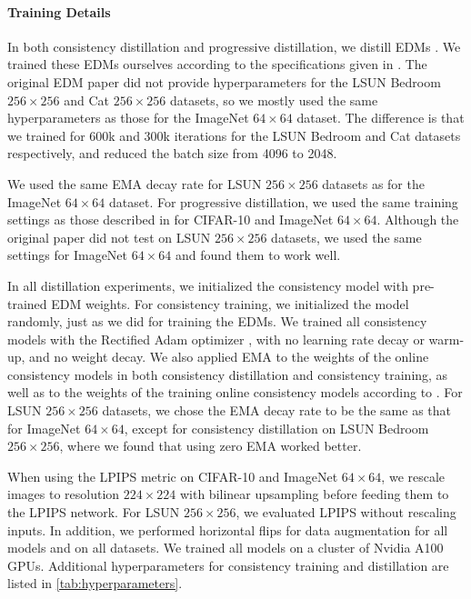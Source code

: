 \begin{appendices}
\paragraph{Training Details}
In both consistency distillation and progressive distillation, we distill EDMs \cite{karras2022edm}. We trained these EDMs ourselves according to the specifications given in \citet{karras2022edm}. The original EDM paper did not provide hyperparameters for the LSUN Bedroom $256\times 256$ and Cat $256\times 256$ datasets, so we mostly used the same hyperparameters as those for the ImageNet $64\times 64$ dataset. The difference is that we trained for 600k and 300k iterations for the LSUN Bedroom and Cat datasets respectively, and reduced the batch size from 4096 to 2048.

We used the same EMA decay rate for LSUN $256\times 256$ datasets as for the ImageNet $64\times 64$ dataset. For progressive distillation, we used the same training settings as those described in \citet{salimans2022progressive} for CIFAR-10 and ImageNet $64\times 64$. Although the original paper did not test on LSUN $256\times 256$ datasets, we used the same settings for ImageNet $64\times 64$ and found them to work well.

In all distillation experiments, we initialized the consistency model with pre-trained EDM weights. For consistency training, we initialized the model randomly, just as we did for training the EDMs. We trained all consistency models with the Rectified Adam optimizer \cite{liu2019variance}, with no learning rate decay or warm-up, and no weight decay. We also applied EMA to the weights of the online consistency models in both consistency distillation and consistency training, as well as to the weights of the training online consistency models according to \citet{karras2022edm}. For LSUN $256\times 256$ datasets, we chose the EMA decay rate to be the same as that for ImageNet $64\times 64$, except for consistency distillation on LSUN Bedroom $256\times 256$, where we found that using zero EMA worked better.

When using the LPIPS metric on CIFAR-10 and ImageNet $64\times 64$, we rescale images to resolution $224\times 224$ with bilinear upsampling before feeding them to the LPIPS network. For LSUN $256\times 256$, we evaluated LPIPS without rescaling inputs. In addition, we performed horizontal flips for data augmentation for all models and on all datasets. We trained all models on a cluster of Nvidia A100 GPUs. Additional hyperparameters for consistency training and distillation are listed in \cref{tab:hyperparameters}.



\end{appendices}
